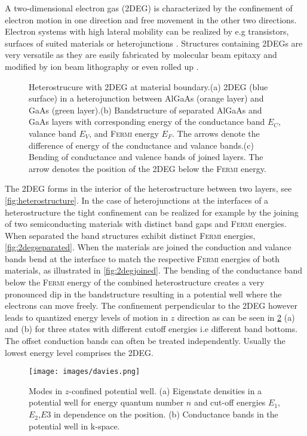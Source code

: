 A two-dimensional electron gas (2DEG) is characterized by the confinement of electron motion in one direction and free movement in the other two directions. 
Electron systems with high lateral mobility can be realized by e.g transistors, surfaces of suited materials \cite{PhysRevLett.12.271} or heterojunctions \cite{JVSTB.4.853}. Structures containing 2DEGs are very versatile as they are easily fabricated by molecular beam epitaxy and modified by ion beam lithography \cite{Ingram1995}\cite{Nowack2009Thesis} or even rolled up \cite{Vorob'ev2004171}. 
\begin{figure}[!h]
\centering
{} \quad\quad
{} \quad\quad
{}
\caption{Heterostrucure with 2DEG at material boundary.(a) 2DEG (blue surface) in a heterojunction between AlGaAs (orange layer) and GaAs (green layer).(b) Bandstructure of separated AlGaAs and GaAs layers with corresponding energy of the conductance band $E_C$, valance band $E_V$, and \textsc{Fermi} energy $E_F$. The arrows denote the difference of energy of the conductance and valance bands.(c) Bending of conductance and valence bands of joined layers. The arrow denotes the position of the 2DEG below the \textsc{Fermi} energy.}
\label{fig:hetero2deg}
\end{figure}
The 2DEG forms in the interior of the heterostructure between two layers, see \cref{fig:heterostructure}. In the case of heterojunctions at the interfaces of a heterostructure the tight confinement can be realized for example by the joining of two semiconducting materials with distinct band gaps and \textsc{Fermi} energies. When separated the band structures exhibit distinct \textsc{Fermi} energies, \cref{fig:2degseparated}. When the materials are joined the conduction and valance bands bend at the interface to match the respective \textsc{Fermi} energies of both materials, as illustrated in \cref{fig:2degjoined}.
The bending of the conductance band below the \textsc{Fermi} energy of the combined heterostructure creates a very pronounced dip in the bandstructure resulting in a potential well where the electrons can move freely. The confinement perpendicular to the 2DEG however leads to quantized energy levels of motion in $z$ direction as can be seen in \cref{fig:potentialwell} (a) and (b) for three states with different cutoff energies i.e different band bottoms. The offset conduction bands can often be treated independently. Usually the lowest energy level comprises the 2DEG\cite{Datta1997}.
\begin{figure}[t]
\centering
\texttt{[image: images/davies.png]}
\caption{Modes in $z$-confined potential well. (a) Eigenstate densities in a potential well for energy quantum number $n$ and cut-off energies $E_1$,$E_2$,$E3$ in dependence on the position. (b) Conductance bands in the potential well in k-space.}
\label{fig:potentialwell}
\end{figure}
